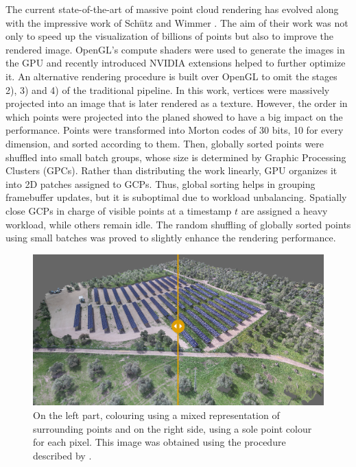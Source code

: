 The current state-of-the-art of massive point cloud rendering has evolved along with the impressive work of Schütz and Wimmer \cite{schutz_rendering_2019, schutz_rendering_2021}. The aim of their work was not only to speed up the visualization of billions of points but also to improve the rendered image. OpenGL's compute shaders were used to generate the images in the GPU and recently introduced NVIDIA extensions helped to further optimize it. An alternative rendering procedure is built over OpenGL to omit the stages 2), 3) and 4) of the traditional pipeline. In this work, vertices were massively projected into an image that is later rendered as a texture. However, the order in which points were projected into the planed showed to have a big impact on the performance. Points were transformed into Morton codes of 30 bits, 10 for every dimension, and sorted according to them. Then, globally sorted points were shuffled into small batch groups, whose size is determined by Graphic Processing Clusters (GPCs). Rather than distributing the work linearly, GPU organizes it into 2D patches assigned to GCPs. Thus, global sorting helps in grouping framebuffer updates, but it is suboptimal due to workload unbalancing. Spatially close GCPs in charge of visible points at a timestamp $t$ are assigned a heavy workload, while others remain idle. The random shuffling of globally sorted points using small batches was proved to slightly enhance the rendering performance.

\begin{figure}[!ht]
	\includegraphics[width=\textwidth]{figs/fundamentals/hqs_comparison.png}
	\caption{On the left part, colouring using a mixed representation of surrounding points and on the right side, using a sole point colour for each pixel. This image was obtained using the procedure described by \cite{schutz_rendering_2021}. }
    \label{fig:hqs_pc_rendering}
\end{figure}

